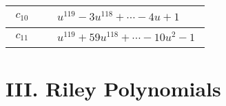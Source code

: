 \documentclass[1p]{elsarticle_modified}
\theoremstyle{definition}
\begin{document}
\begin{tabular}{m{50pt}|m{274pt}}
\hline $$\begin{aligned}c_{10}\end{aligned}$$&$\begin{aligned}
&u^{119}-3 u^{118}+\cdots-4 u+1
\end{aligned}$\\
\hline $$\begin{aligned}c_{11}\end{aligned}$$&$\begin{aligned}
&u^{119}+59 u^{118}+\cdots-10 u^2-1
\end{aligned}$\\
\hline
\end{tabular}\newpage\renewcommand{\arraystretch}{1}
\centering \section*{ III. Riley Polynomials}
\end{document}
